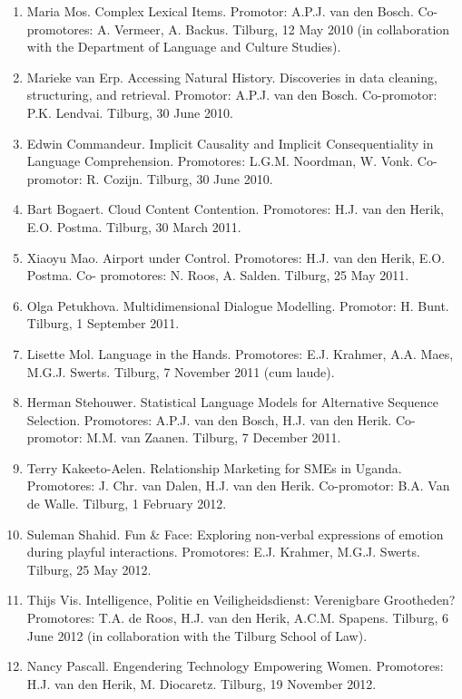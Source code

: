\begin{enumerate}
\item{ Maria Mos. Complex Lexical Items. Promotor: A.P.J. van den Bosch.  
Co-promotores: A.
Vermeer, A. Backus. Tilburg, 12 May 2010 (in collaboration with the Department of Language
and Culture Studies).}
\item{ Marieke van Erp. Accessing Natural History. Discoveries in data 
cleaning, structuring, and
retrieval. Promotor: A.P.J. van den Bosch. Co-promotor: P.K. Lendvai. Tilburg, 
30 June 2010.}
\item{ Edwin Commandeur. Implicit Causality and Implicit Consequentiality in 
Language
Comprehension. Promotores: L.G.M. Noordman, W. Vonk. Co-promotor: R. Cozijn. Tilburg, 30
June 2010.}
\item{ Bart Bogaert. Cloud Content Contention. Promotores: H.J. van den Herik, 
E.O.  Postma. Tilburg,
30 March 2011.}

\item{ Xiaoyu Mao. Airport under Control. Promotores: H.J. van den Herik, E.O.  
Postma. Co-
promotores: N. Roos, A. Salden. Tilburg, 25 May 2011.}

\item{ Olga Petukhova. Multidimensional Dialogue Modelling. Promotor: H. Bunt.  
Tilburg, 1
September 2011.}
\item{ Lisette Mol. Language in the Hands. Promotores: E.J. Krahmer, A.A. Maes, 
M.G.J. Swerts.
Tilburg, 7 November 2011 (cum laude).}
\item{ Herman Stehouwer. Statistical Language Models for Alternative Sequence 
Selection.
Promotores: A.P.J. van den Bosch, H.J. van den Herik. Co-promotor: M.M. van Zaanen. Tilburg,
7 December 2011.}
\item{ Terry Kakeeto-Aelen. Relationship Marketing for SMEs in Uganda.  
Promotores: J. Chr. van
Dalen, H.J. van den Herik. Co-promotor: B.A. Van de Walle. Tilburg, 1 February 
2012.}
\item{ Suleman Shahid. Fun \& Face: Exploring non-verbal expressions of emotion 
during playful
interactions. Promotores: E.J. Krahmer, M.G.J. Swerts. Tilburg, 25 May 2012.}
\item{ Thijs Vis. Intelligence, Politie en Veiligheidsdienst: Verenigbare 
Grootheden? Promotores: T.A.
de Roos, H.J. van den Herik, A.C.M. Spapens. Tilburg, 6 June 2012 (in collaboration with the
Tilburg School of Law).}
\item{ Nancy Pascall. Engendering Technology Empowering Women. Promotores: H.J.  
van den Herik,
M. Diocaretz. Tilburg, 19 November 2012.}


\end{enumerate}
